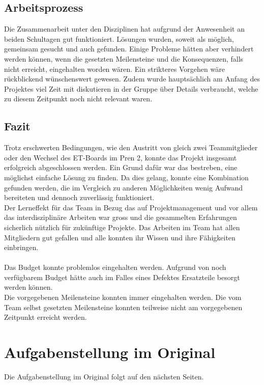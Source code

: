 \documentclass[a4paper]{report}
\begin{document}
\section{Arbeitsprozess}
	Die Zusammenarbeit unter den Disziplinen hat aufgrund der Anwesenheit an beiden Schultagen gut funktioniert. Lösungen wurden, soweit als möglich, gemeinsam gesucht und auch gefunden. Einige Probleme hätten aber verhindert werden können, wenn die gesetzten Meilensteine und die Konsequenzen, falls nicht erreicht, eingehalten worden wären. Ein strikteres Vorgehen wäre rückblickend wünschenswert gewesen. Zudem wurde hauptsächlich am Anfang des Projektes viel Zeit mit diskutieren in der Gruppe über Details verbraucht, welche zu diesem Zeitpunkt noch nicht relevant waren.

	\section{Fazit}
	Trotz erschwerten Bedingungen, wie den Austritt von gleich zwei Teammitglieder oder den Wechsel des ET-Boards im Pren 2, konnte das Projekt insgesamt erfolgreich abgeschlossen werden. Ein Grund dafür war das bestreben, eine möglichst einfache Lösung zu finden. Da dies gelang, konnte eine Kombination gefunden werden, die im Vergleich zu anderen Möglichkeiten wenig Aufwand bereiteten und dennoch zuverlässig funktioniert.\\
	Der Lerneffekt für das Team in Bezug das auf Projektmanagement und vor allem das interdisziplinäre Arbeiten war gross und die gesammelten Erfahrungen sicherlich nützlich für zukünftige Projekte. Das Arbeiten im Team hat allen Mitgliedern gut gefallen und alle konnten ihr Wissen und ihre Fähigkeiten einbringen.\\
	\\
	Das Budget konnte problemlos eingehalten werden. Aufgrund von noch verfügbarem Budget hätte auch im Falles eines Defektes Ersatzteile besorgt werden können.\\
	Die vorgegebenen Meilensteine konnten immer eingehalten werden. Die vom Team selbst gesetzten Meilensteine konnten teilweise nicht am vorgegebenen Zeitpunkt erreicht werden.


\listoffigures

\listoftables

\printbibliography

\appendix

\chapter{Aufgabenstellung im Original}
\label{app:ch:AufgabenOriginal}
Die Aufgabenstellung im Original folgt auf den nächsten Seiten.
\end{document}
